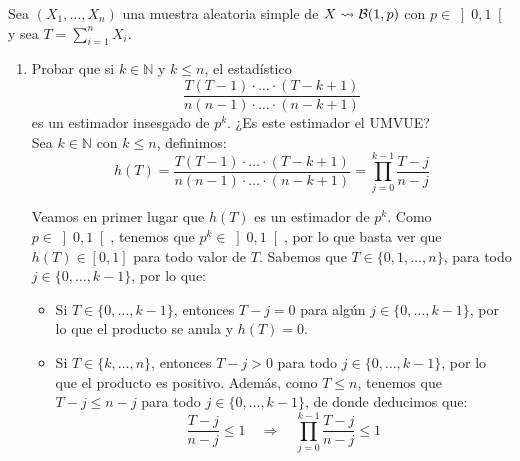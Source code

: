 \begin{ejercicio}
    Sea $(X_1, \ldots, X_n)$ una muestra aleatoria simple de $X\rightsquigarrow \mathcal{B}(1,p)$ con $p\in \left]0,1\right[$ y sea $T=\sum\limits_{i=1}^{n}X_i$.
    \begin{enumerate}
        \item Probar que si $k\in \mathbb{N}$ y $k\leq n$, el estadístico
            \begin{equation*}
                \dfrac{T(T-1)\cdot \ldots\cdot (T-k+1)}{n(n-1)\cdot \ldots\cdot (n-k+1)}
            \end{equation*}
            es un estimador insesgado de $p^k$. ¿Es este estimador el UMVUE?\\

            Sea $k\in \mathbb{N}$ con $k\leq n$, definimos:
            \begin{equation*}
                h(T) = \dfrac{T(T-1)\cdot \ldots\cdot (T-k+1)}{n(n-1)\cdot \ldots\cdot (n-k+1)}
                = \prod_{j=0}^{k-1}\dfrac{T-j}{n-j}
            \end{equation*}

            Veamos en primer lugar que $h(T)$ es un estimador de $p^k$. Como $p\in \left]0,1\right[$, tenemos que $p^k \in \left]0,1\right[$, por lo que basta ver que $h(T)\in [0,1]$ para todo valor de $T$. Sabemos que $T\in \{0,1,\ldots,n\}$, para todo $j\in \{0,\ldots,k-1\}$, por lo que:
            \begin{itemize}
                \item Si $T\in \{0,\ldots,k-1\}$, entonces $T-j=0$ para algún $j\in \{0,\ldots,k-1\}$, por lo que el producto se anula y $h(T) = 0$.
                \item Si $T\in \{k,\ldots,n\}$, entonces $T-j>0$ para todo $j\in \{0,\ldots,k-1\}$, por lo que el producto es positivo. Además, como $T\leq n$, tenemos que $T-j \leq n-j$ para todo $j\in \{0,\ldots,k-1\}$, de donde deducimos que:
                \begin{equation*}
                    \dfrac{T-j}{n-j} \leq 1 \quad \Longrightarrow \quad \prod_{j=0}^{k-1}\dfrac{T-j}{n-j} \leq 1
                \end{equation*}
            \end{itemize}


\end{enumerate}
\end{ejercicio}
